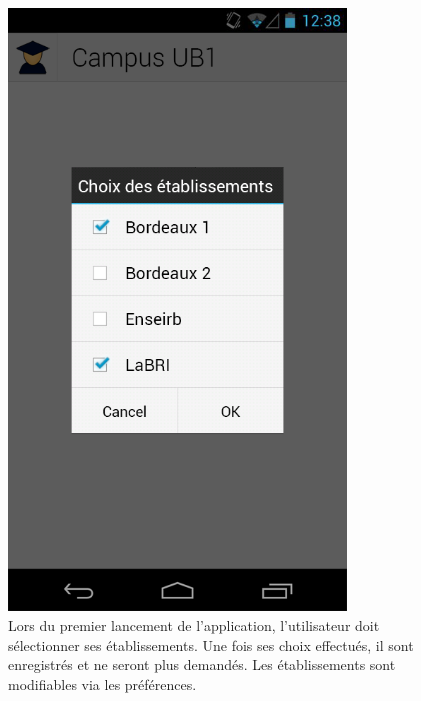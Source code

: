 \documentclass [pdftex,12pt] {report}
\begin{document}
\begin{figure}
  \begin{minipage}[t]{8cm}
    \centering
    \includegraphics[width=0.8\textwidth]{resources/ui_preview/01}
    \caption{Lors du premier lancement de l'application, l'utilisateur doit sélectionner ses établissements. Une fois ses choix effectués, il sont enregistrés et ne seront plus demandés. Les établissements sont modifiables via les préférences.}
    \label{fig:01}
  \end{minipage}
  \hspace{+20pt}
  \begin{minipage}[t]{8cm}
    \centering

\end{minipage}
\end{figure}
\end{document}
